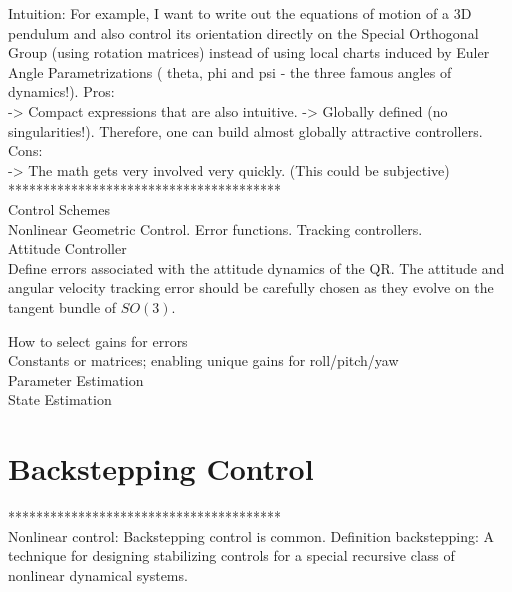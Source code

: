Intuition:  For example, I want to write out the equations of motion of a 3D pendulum and also control its orientation directly on the Special Orthogonal Group (using rotation matrices)  instead of using local charts induced by Euler Angle Parametrizations ( theta, phi and psi - the three famous angles of dynamics!).
Pros:\\
->  Compact expressions that are also intuitive.
-> Globally defined (no singularities!). Therefore, one can build almost globally attractive controllers.\\
Cons:\\
-> The math gets very involved very quickly. (This could be subjective)
***************************************\\




Control Schemes\\
Nonlinear Geometric Control. Error functions. Tracking controllers.\\

Attitude Controller\\

Define errors associated with the attitude dynamics of the QR. The attitude and angular velocity tracking error should be carefully chosen as they evolve on the tangent bundle of  $ SO(3) $. \cite{Lee 2010c} 

How to select gains for errors\\
Constants \cite{Lee2010} or matrices; enabling unique gains for roll/pitch/yaw \cite{Mellinger2011}\\

Parameter Estimation\\
State Estimation\\

\section{Backstepping Control}

***************************************\\
Nonlinear control: Backstepping control is common.
Definition backstepping: A technique for designing stabilizing controls for a special recursive class of nonlinear dynamical systems.

